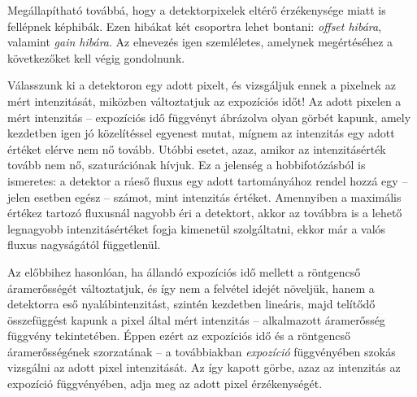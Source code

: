 \documentclass[a4paper,12pt,twoside]{article}
\begin{document}
Megállapítható továbbá, hogy a detektorpixelek eltérő érzékenysége miatt is fellépnek képhibák. Ezen hibákat két csoportra lehet bontani: \emph{offset hibára}, valamint \emph{gain hibára}. Az elnevezés igen szemléletes, amelynek megértéséhez a következőket kell végig gondolnunk. 

Válasszunk ki a detektoron egy adott pixelt, és vizsgáljuk ennek a pixelnek az mért intenzitását, miközben változtatjuk az expozíciós időt! Az adott pixelen a mért intenzitás -- expozíciós idő függvényt ábrázolva olyan görbét kapunk, amely kezdetben igen jó közelítéssel egyenest mutat, mígnem az intenzitás egy adott értéket elérve nem nő tovább. Utóbbi esetet, azaz, amikor az intenzitásérték tovább nem nő, szaturációnak hívjuk. Ez a jelenség a hobbifotózásból is ismeretes: a detektor a ráeső fluxus egy adott tartományához rendel hozzá egy -- jelen esetben egész -- számot, mint intenzitás értéket. Amennyiben a maximális értékez tartozó fluxusnál nagyobb éri a detektort, akkor az továbbra is a lehető legnagyobb intenzitásértéket fogja kimenetül szolgáltatni, ekkor már a valós fluxus nagyságától függetlenül. 

Az előbbihez hasonlóan, ha állandó expozíciós idő mellett a röntgencső áramerősségét változtatjuk, és így nem a felvétel idejét növeljük, hanem a detektorra eső nyalábintenzitást, szintén kezdetben lineáris, majd telítődő összefüggést kapunk a pixel által mért intenzitás -- alkalmazott áramerősség függvény tekintetében. Éppen ezért az expozíciós idő és a röntgencső áramerősségének szorzatának -- a továbbiakban \emph{expozíció} függvényében szokás vizsgálni az adott pixel intenzitását. Az így kapott görbe, azaz az intenzitás az expozíció függvényében, adja meg az adott pixel érzékenységét.
\end{document}
